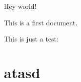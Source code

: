 \documentclass{article}
\begin{document}
Hey world!

This is a first document.

This is just a test:

\section{atasd}
\end{document}
